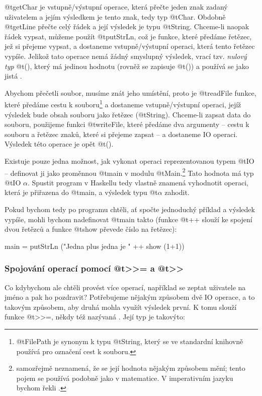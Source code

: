 @t{getChar} je vstupně/výstupní operace, která přečte jeden znak zadaný
uživatelem a jejím výsledkem je tento znak, tedy typ @t{Char}. Obdobně
@t{getLine} přečte celý řádek a její výsledek je typu @t{String}. Chceme-li
naopak řádek vypsat, můžeme použít @t{putStrLn}, což je funkce, které
předáme řetězec, jež si přejeme vypsat, a dostaneme vstupně/výstupní operaci,
která tento řetězec vypíše. Jelikož tato operace nemá žádný smyslupný výsledek,
vrací tzv. \emph{nulový typ} @t{()}, který má jedinou hodnotu (rovněž se zapisuje
@t{()}) a používá se jako jistá .

Abychom přečetli soubor, musíme znát jeho umístění, proto je @t{readFile}
funkce, které předáme cestu k souboru\footnote{@t{FilePath} je synonym k typu
  @t{String}, který se ve standardní knihovně používá pro označení cest k
souboru.} a dostaneme vstupně/výstupní operaci, jejíž výsledek bude obsah
souboru jako řetězec (@t{String}). Chceme-li zapsat data do souboru, použijeme
funkci @t{writeFile}, které předáme dva argumenty -- cestu k souboru a řetězec
znaků, které si přejeme zapsat -- a dostaneme IO operaci. Výsledek této operace
je opět @t{()}.

Existuje pouze jedna možnost, jak vykonat operaci reprezentovanou typem @t{IO}
-- definovat ji jako proměnnou @t{main} v modulu
@t{Main}.\footnote{ samozřejmě neznamená, že se její hodnota
  nějakým způsobem mění; tento pojem se používá podobně jako v matematice. V
imperativním jazyku bychom řekli .} Tato hodnota má typ @t{IO
$\alpha$}. Spustit program v Haskellu tedy vlastně znamená vyhodnotit operaci,
která je přiřazena do @t{main}, a výsledek typu @t{$\alpha$} zahodit.

Pokud bychom tedy po programu chtěli, ať spočte jednoduchý příklad a výsledek
vypíše, mohli bychom nadefinovat @t{main} takto (funkce @t{++} slouží ke spojení
dvou řetězců a funkce @t{show} převede číslo na řetězec):

\begin{haskell}
main = putStrLn ("Jedna plus jedna je " ++ show (1+1))
\end{haskell}

\subsubsection{\texorpdfstring
  {Spojování operací pomocí @t{>>=} a @t{>>}}
  {Spojování operací pomocí >>= a >>}}

Co kdybychom ale chtěli provést více operací, například se zeptat uživatele na
jméno a pak ho pozdravit? Potřebujeme nějakým způsobem  dvě IO
operace, a to takovým způsobem, aby druhá mohla využít výsledek první. K tomu
slouží funkce @t{>>=}, někdy též nazývaná . Její typ je takovýto:

